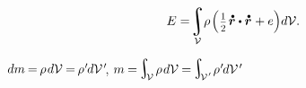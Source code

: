 \nopagebreak\en{\vspace{-0.1em}}\ru{\vspace{-0.8em}}%
\begin{equation}\label{internalenergy:continuumthermodynamics}
E = \hspace{-0.44ex} \integral\displaylimits_{\mathcal{V}} \hspace{-0.5ex} \rho \hspace{.2ex} \Bigl( \hspace{.1ex}
   \smalldisplaystyleonehalf \hspace{.2ex}
   \mathdotabove{\currentlocationvector}
   \dotp
   \mathdotabove{\currentlocationvector}
   \hspace{.1ex} +
   e
\Bigr)
d\mathcal{V}
.
\end{equation}

\vspace{-0.5em}\noindent
{}
${dm \hspace{-0.15ex} = \hspace{-0.2ex} \rho \hspace{.2ex} d\mathcal{V} \hspace{-0.1ex} = \hspace{-0.2ex} \rho\hspace{.1ex}' \hspace{-0.2ex} d\mathcal{V}\hspace{.2ex}'\hspace{-0.5ex}}$,
${m \hspace{-0.1ex} = \hspace{-0.2ex} \scalebox{1.4}{$\integral$}_{\hspace{-0.5ex}\raisemath{-0.05em}{\mathcal{V}}} \hspace{.3ex} \rho \hspace{.2ex} d\mathcal{V} \hspace{-0.1ex}
= \hspace{-0.2ex} \scalebox{1.4}{$\integral$}_{\hspace{-0.5ex}\raisemath{-0.05em}{\mathcal{V}\hspace{.12ex}'}} \hspace{.2ex} \rho\hspace{.1ex}' \hspace{-0.2ex} d\mathcal{V}\hspace{.2ex}'\hspace{-0.25ex}}$
%

